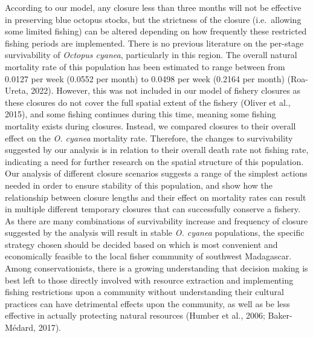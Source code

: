 \documentclass[
]{article}
\begin{document}
According to our model, any closure less than three months will not be effective in preserving blue octopus stocks, but the strictness of the closure (i.e.~allowing some limited fishing) can be altered depending on how frequently these restricted fishing periods are implemented. There is no previous literature on the per-stage survivability of \emph{Octopus cyanea}, particularly in this region. The overall natural mortality rate of this population has been estimated to range between from 0.0127 per week (0.0552 per month) to 0.0498 per week (0.2164 per month) (Roa-Ureta, 2022). However, this was not included in our model of fishery closures as these closures do not cover the full spatial extent of the fishery (Oliver et al., 2015), and some fishing continues during this time, meaning some fishing mortality exists during closures. Instead, we compared closures to their overall effect on the \emph{O. cyanea} mortality rate. Therefore, the changes to survivability suggested by our analysis is in relation to their overall death rate not fishing rate, indicating a need for further research on the spatial structure of this population. Our analysis of different closure scenarios suggests a range of the simplest actions needed in order to ensure stability of this population, and show how the relationship between closure lengths and their effect on mortality rates can result in multiple different temporary closures that can successfully conserve a fishery. As there are many combinations of survivability increase and frequency of closure suggested by the analysis will result in stable \emph{O. cyanea} populations, the specific strategy chosen should be decided based on which is most convenient and economically feasible to the local fisher community of southwest Madagascar. Among conservationists, there is a growing understanding that decision making is best left to those directly involved with resource extraction and implementing fishing restrictions upon a community without understanding their cultural practices can have detrimental effects upon the community, as well as be less effective in actually protecting natural resources (Humber et al., 2006; Baker-Médard, 2017).
\end{document}
